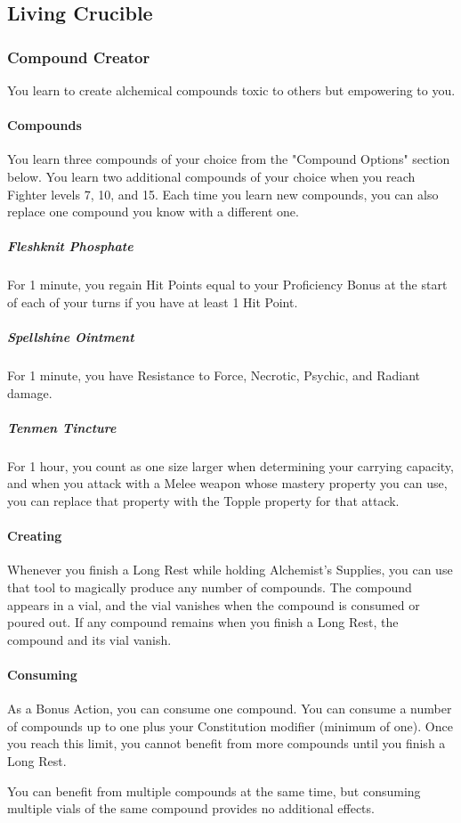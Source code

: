 \documentclass[letterpaper,openany,oneside,twocolumn]{book}
\begin{document}
\subsection*{Living Crucible}
\subsubsection*{Compound Creator}
You learn to create alchemical compounds toxic to others but empowering to you.

\paragraph*{Compounds} You learn three compounds of your choice from the "Compound Options" section below. You learn two additional compounds of your choice when you reach Fighter levels 7, 10, and 15. Each time you learn new compounds, you can also replace one compound you know with a different one.
\subparagraph*{Fleshknit Phosphate} For 1 minute, you regain Hit Points equal to your Proficiency Bonus at the start of each of your turns if you have at least 1 Hit Point.
\subparagraph*{Spellshine Ointment} For 1 minute, you have Resistance to Force, Necrotic, Psychic, and Radiant damage.
\subparagraph*{Tenmen Tincture} For 1 hour, you count as one size larger when determining your carrying capacity, and when you attack with a Melee weapon whose mastery property you can use, you can replace that property with the Topple property for that attack.
\paragraph*{Creating} Whenever you finish a Long Rest while holding Alchemist's Supplies, you can use that tool to magically produce any number of compounds. The compound appears in a vial, and the vial vanishes when the compound is consumed or poured out. If any compound remains when you finish a Long Rest, the compound and its vial vanish.
\paragraph*{Consuming} As a Bonus Action, you can consume one compound. You can consume a number of compounds up to one plus your Constitution modifier (minimum of one). Once you reach this limit, you cannot benefit from more compounds until you finish a Long Rest.

You can benefit from multiple compounds at the same time, but consuming multiple vials of the same compound provides no additional effects.
\end{document}
